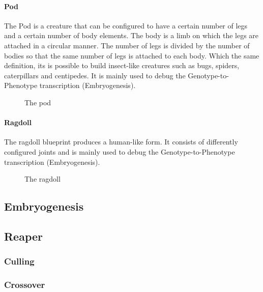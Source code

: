\documentclass[main]{subfiles}
\begin{document}
\paragraph{Pod}

The Pod is a creature that can be configured to have a certain number of legs and a certain number of body elements. The body is a limb on which the legs are attached in a circular manner. The number of legs is divided by the number of bodies so that the same number of legs is attached to each body. Which the same definition, its is possible to build insect-like creatures such as bugs, spiders, caterpillars and centipedes. It is mainly used to debug the Genotype-to-Phenotype transcription (Embryogenesis).

\begin{figure}[!h]
\centering
{}
\caption{The pod}
\label{figure:pod}
\end{figure}

\paragraph{Ragdoll}

The ragdoll blueprint produces a human-like form. It consists of differently configured joints and is mainly used to debug the Genotype-to-Phenotype transcription (Embryogenesis).

\begin{figure}[!h]
\centering
{}
\caption{The ragdoll}
\label{figure:ragdoll}
\end{figure}

\subsection{Embryogenesis}

\lipsum[13]

\subsection{Reaper}
\label{subsection:Reaper}

\lipsum[13]

\subsubsection{Culling}
\label{subsubsection:Culling}

\lipsum[14]

\subsubsection{Crossover}
\end{document}
